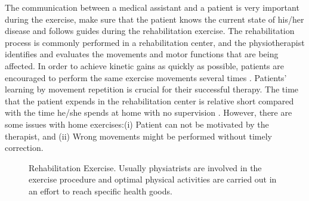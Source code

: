 The communication between a medical assistant and a patient is very important during the exercise, \eg make sure that the patient knows the current state of his/her disease and follows guides during the rehabilitation exercise. The rehabilitation process is commonly performed in a rehabilitation center, and the physiotherapist identifies and evaluates the movements and motor functions that are being affected. In order to achieve kinetic gains as quickly as possible, patients are encouraged to perform the same exercise movements several times \cite{Metcalf2013}. Patients' learning by movement repetition is crucial for their successful therapy. The time that the patient expends in the rehabilitation center is relative short compared with the time he/she spends at home with no supervision \cite{Crocher2013}. However, there are some issues with home exercises:(i) Patient can not be motivated by the therapist, and (ii) Wrong movements might be performed without timely correction.

\begin{figure}
	\centering
	\qquad
	\caption{Rehabilitation Exercise. Usually physiatrists are involved in the exercise procedure and optimal physical activities are carried out in an effort to reach specific health goods.}
	\label{fig:2-bg:rehabilitation}
\end{figure}

